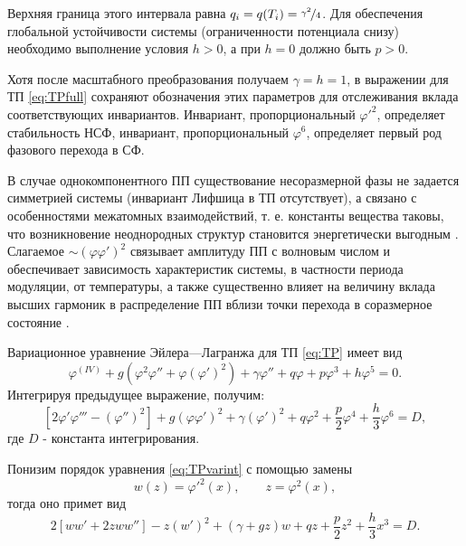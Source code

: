 Верхняя граница этого интервала равна \cite{Ishibashi1978} $q_i = q(T_i) = \nicefrac{\gamma^2}{4}$.
Для обеспечения глобальной устойчивости системы (ограниченности потенциала снизу) необходимо выполнение условия $h>0$, а при $h=0$ должно быть $p>0$.

Хотя после масштабного преобразования получаем $\gamma=h=1$, в выражении для ТП \eqref{eq:TPfull} сохраняют обозначения этих параметров для отслеживания вклада соответствующих инвариантов.
Инвариант, пропорциональный $\varphi'^2$, определяет стабильность НСФ, инвариант, пропорциональный $\varphi^6$, определяет первый род фазового перехода в СФ.

В случае однокомпонентного ПП существование несоразмерной фазы не задается симметрией системы (инвариант Лифшица в ТП отсутствует), а связано с особенностями  межатомных взаимодействий, т. е. константы вещества таковы, что возникновение неоднородных структур становится энергетически выгодным \cite{Klepikov1996}.
Слагаемое $\sim\left(\varphi\varphi'\right)^2$ связывает амплитуду ПП с волновым числом и обеспечивает зависимость характеристик системы, в частности периода модуляции, от температуры, а также существенно влияет на величину вклада высших гармоник в распределение ПП вблизи точки перехода в соразмерное состояние \cite{Berezovsky1998, Berezovsky1998ua}.

Вариационное уравнение Эйлера—Лагранжа для ТП \eqref{eq:TP} имеет вид
\begin{equation}
\varphi^{(IV)} + 
g\left(\varphi^2\varphi'' + \varphi\left(\varphi'\right)^2\right) +
\gamma\varphi'' + q\varphi + p\varphi^3 + h\varphi^5 = 0.
\label{eq:TPvar}
\end{equation}
Интегрируя предыдущее выражение, получим:
\begin{equation}
\left[2\varphi'\varphi''' - \left(\varphi''\right)^2\right] +
g\left(\varphi\varphi'\right)^2 + \gamma\left(\varphi'\right)^2 +
q\varphi^2 +\frac{p}{2}\varphi^4 + \frac{h}{3}\varphi^6 = D,
\label{eq:TPvarint}
\end{equation}
где $D$ - константа интегрирования.

Понизим порядок уравнения \eqref{eq:TPvarint} с помощью замены
\begin{equation}
w(z) = \varphi'^2(x), \qquad z = \varphi^2(x),
\label{eq:wsubst}
\end{equation}
тогда оно примет вид
\begin{equation}
2\left[ww' + 2zww''\right] - z\left(w'\right)^2 + (\gamma+gz)w +
qz +\frac{p}{2}z^2 + \frac{h}{3}x^3 = D.
\label{eq:varwsubst}
\end{equation}

